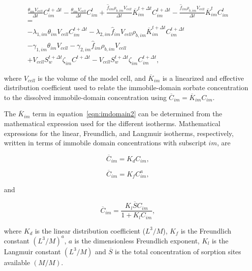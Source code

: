 \begin{equation}
\label{eqn:imdomain2}
\begin{split}
\frac{\theta_{im} V_{cell}}{\Delta t} C_{im}^{t + \Delta t} - 
\frac{\theta_{im} V_{cell}}{\Delta t} C_{im}^t 
+ \frac{\hat{f}_{im} \rho_{b,im} V_{cell}}{\Delta t} \overline{K}_{im}^{t + \Delta t} C_{im}^{t + \Delta t}
-  \frac{\hat{f}_{im} \rho_{b,im} V_{cell}}{\Delta t} \overline{K}_{im}^t C_{im}^{t} \\
= \\
- \lambda_{1,im} \theta_{im} V_{cell} C_{im}^{t + \Delta t}
- \lambda_{2,im} \hat{f}_{im} V_{cell} \rho_{b,im} \overline{K}_{im}^{t + \Delta t} C_{im}^{t + \Delta t} \\
- \gamma_{1,im} \theta_{im} V_{cell}  
- \gamma_{2,im} \hat{f}_{im} \rho_{b,im} V_{cell} \\
+ V_{cell} S_w^{t + \Delta t}  \zeta_{im} C^{t + \Delta t}
- V_{cell} S_w^{t + \Delta t}  \zeta_{im} C_{im}^{t + \Delta t} ,
\end{split}
\end{equation}

\noindent where $V_{cell}$ is the volume of the model cell, and $\overline{K}_{im}$ is a linearized and effective distribution coefficient used to relate the immobile-domain sorbate concentration to the dissolved immobile-domain concentration using $\overline{C}_{im} = \overline{K}_{im} C_{im}$.

The $\overline{K}_{im}$ term in equation~\ref{eqn:imdomain2} can be determined from the mathematical expression used for the different isotherms.   Mathematical expressions for the linear, Freundlich, and Langmuir isotherms, respectively, written in terms of immobile domain concentrations with subscript $im$, are

\begin{equation}
\label{eqn:linear}
\overline{C}_{im} = K_d C_{im},
\end{equation}

\begin{equation}
\label{eqn:freundlich}
\overline{C}_{im} = K_f C_{im}^a,
\end{equation}

\noindent and

\begin{equation}
\label{eqn:langmuir}
\overline{C}_{im} = \frac{K_l \overline{S} C_{im}}{1 + K_l C_{im}},
\end{equation}

\noindent where $K_d$ is the linear distribution coefficient ($L^3/M$), $K_f$ is the Freundlich constant $(L^3 / M)^a$, $a$ is the dimensionless Freundlich exponent, $K_l$ is the Langmuir constant $(L^3 / M)$ and $\overline{S}$ is the total concentration of sorption sites available $(M/M)$.

